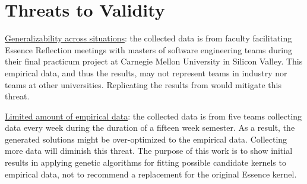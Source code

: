 \documentclass[3p,times,procedia]{elsarticle}
\begin{document}





\section{Threats to Validity}

\underline{Generalizability across situations}: the collected data is from faculty facilitating Essence Reflection meetings \cite{EASE2014} with masters of software engineering teams during their final practicum project at Carnegie Mellon University in Silicon Valley. This empirical data, and thus the results, may not represent teams in industry nor teams at other universities. Replicating the results from \cite{ICSE2014} would mitigate this threat.

\underline{Limited amount of empirical data}: the collected data is from five teams collecting data every week during the duration of a fifteen week semester. As a result, the generated solutions might be over-optimized to the empirical data. Collecting more data will diminish this threat. The purpose of this work is to show initial results in applying genetic algorithms for fitting possible candidate kernels to empirical data, not to recommend a replacement for the original Essence kernel. 
\end{document}
